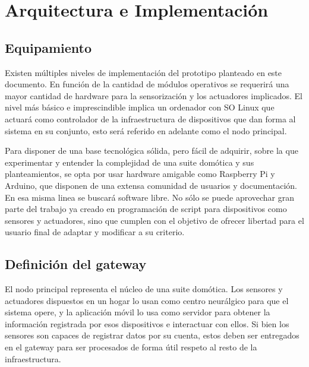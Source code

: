 \cleardoublepage

\chapter{Arquitectura e Implementación}
\label{makereference4}

\section{Equipamiento}
\label{makereference4.1}

Existen múltiples niveles de implementación del prototipo planteado en este documento. En función de la cantidad de módulos operativos se requerirá una mayor cantidad de hardware para la sensorización y los actuadores implicados. El nivel más básico e imprescindible implica un ordenador con SO Linux que actuará como controlador de la infraestructura de dispositivos que dan forma al sistema en su conjunto, esto será referido en adelante como el nodo principal.

\vspace{1cm}

Para disponer de una base tecnológica sólida, pero fácil de adquirir, sobre la que experimentar y entender la complejidad de una suite domótica y sus planteamientos, se opta por usar hardware amigable como Raspberry Pi y Arduino, que disponen de una extensa comunidad de usuarios y documentación. En esa misma linea se buscará software libre. No sólo se puede aprovechar gran parte del trabajo ya creado en programación de \gls{script} para dispositivos como sensores y actuadores, sino que cumplen con el objetivo de ofrecer libertad para el usuario final de adaptar y modificar a su criterio.

\section{Definición del gateway}
\label{makereference4.2}

El nodo principal representa el núcleo de una suite domótica. Los sensores y actuadores dispuestos en un hogar lo usan como centro neurálgico para que el sistema opere, y la aplicación móvil lo usa como servidor para obtener la información registrada por esos dispositivos e interactuar con ellos. Si bien los sensores son capaces de registrar datos por su cuenta, estos deben ser entregados en el \gls{gateway} para ser procesados de forma útil respeto al resto de la infraestructura. 

\vspace{1cm}

